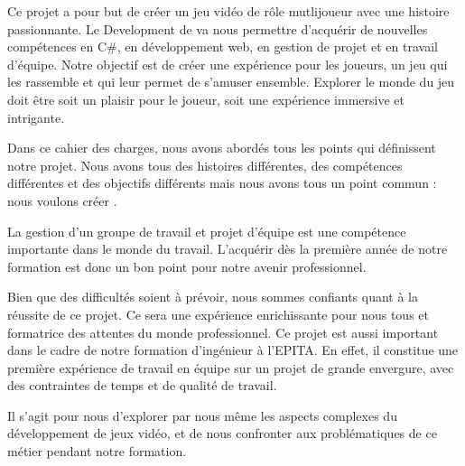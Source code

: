 Ce projet a pour but de créer un jeu vidéo de rôle mutlijoueur avec une histoire passionnante.
Le Development de \textit{\gameName} va nous permettre d’acquérir de nouvelles compétences en C\#, en développement web, en gestion de projet et en travail d'équipe.
Notre objectif est de créer une expérience pour les joueurs, un jeu qui les rassemble et qui leur permet de s'amuser ensemble.
Explorer le monde du jeu doit être soit un plaisir pour le joueur, soit une expérience immersive et intrigante.

Dans ce cahier des charges, nous avons abordés tous les points qui définissent notre projet.
Nous avons tous des histoires différentes, des compétences différentes et des objectifs différents mais nous avons tous un point commun : nous voulons créer \textit{\gameName}.

La gestion d'un groupe de travail et projet d'équipe est une compétence importante dans le monde du travail.
L'acquérir dès la première année de notre formation est donc un bon point pour notre avenir professionnel.

Bien que des difficultés soient à prévoir, nous sommes confiants quant à la réussite de ce projet. 
Ce sera une expérience enrichissante pour nous tous et formatrice des attentes du monde professionnel.
Ce projet est aussi important dans le cadre de notre formation d'ingénieur à l'EPITA.
En effet, il constitue une première expérience de travail en équipe sur un projet de grande envergure, avec des contraintes de temps et de qualité de travail.

Il s'agit pour nous d'explorer par nous même les aspects complexes du développement de jeux vidéo, et de nous confronter aux problématiques de ce métier pendant notre formation.

